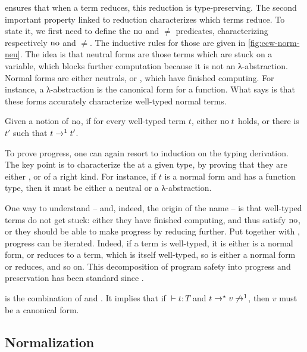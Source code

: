  ensures that when a term reduces, this reduction is type-preserving.
The second important property linked to reduction characterizes which terms reduce.
To state it, we first need to define the $\mathrel{\mathrm{no}}$ and $\ne$ predicates,
characterizing respectively  $\mathrel{\mathrm{no}}$ and  $\ne$.
The inductive rules for those are given in \cref{fig:ccw-norm-neu}.
The idea is that neutral forms are those terms which are stuck on a variable, which blocks
further computation because it is not an λ-abstraction. Normal forms are either neutrals,
or , which have finished computing. For instance, a λ-abstraction is
the canonical form for a function. What  says is that these forms accurately
characterize well-typed normal terms.

\begin{property}
  Given a notion of  $\mathrel{\mathrm{no}}$, if for every well-typed term $t$,
  either $\mathrel{\mathrm{no}} t$ holds, or there is $t'$ such that $t \rightarrow^1 t'$.
\end{property}

To prove progress, one can again resort to induction on the typing derivation. The key point
is to characterize the  at a given type,
by proving that they are either , or  of a right kind.
For instance, if $t$ is a normal form and has a function type, then it must be
either a neutral or a λ-abstraction.

One way to understand  – and, indeed, the origin of the name – is that well-typed
terms do not get stuck: either they have finished computing, and thus satisfy $\mathrel{\mathrm{no}}$, or
they should be able to make progress by reducing further.
Put together with , progress can be iterated. Indeed,
if a term is well-typed, it is either is a normal form, or reduces to a term, which is itself
well-typed, so is either a normal form or reduces, and so on. This decomposition of
program safety into progress and preservation
has been standard since .

\begin{property}
   is the combination of  and .
  It implies that if $\vdash t : T$ and $t \rightarrow^{\star} v \not \rightarrow^1$, then $v$ must be a
  canonical form.
\end{property}



\subsection{Normalization}

